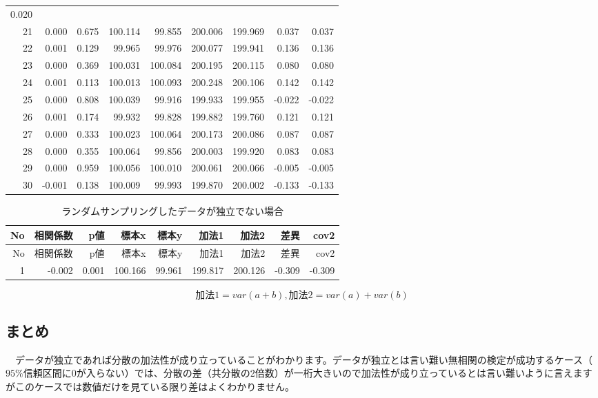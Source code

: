 \documentclass[]{tufte-handout}
\begin{document}
\begin{longtable}[]{@{}rrrrrrrrr@{}}
0.020 \\
21 & 0.000 & 0.675 & 100.114 & 99.855 & 200.006 & 199.969 & 0.037 &
0.037 \\
22 & 0.001 & 0.129 & 99.965 & 99.976 & 200.077 & 199.941 & 0.136 &
0.136 \\
23 & 0.000 & 0.369 & 100.031 & 100.084 & 200.195 & 200.115 & 0.080 &
0.080 \\
24 & 0.001 & 0.113 & 100.013 & 100.093 & 200.248 & 200.106 & 0.142 &
0.142 \\
25 & 0.000 & 0.808 & 100.039 & 99.916 & 199.933 & 199.955 & -0.022 &
-0.022 \\
26 & 0.001 & 0.174 & 99.932 & 99.828 & 199.882 & 199.760 & 0.121 &
0.121 \\
27 & 0.000 & 0.333 & 100.023 & 100.064 & 200.173 & 200.086 & 0.087 &
0.087 \\
28 & 0.000 & 0.355 & 100.064 & 99.856 & 200.003 & 199.920 & 0.083 &
0.083 \\
29 & 0.000 & 0.959 & 100.056 & 100.010 & 200.061 & 200.066 & -0.005 &
-0.005 \\
30 & -0.001 & 0.138 & 100.009 & 99.993 & 199.870 & 200.002 & -0.133 &
-0.133 \\
\bottomrule
\end{longtable}

\begin{longtable}[]{@{}rrrrrrrrr@{}}
\caption{ランダムサンプリングしたデータが独立でない場合}\tabularnewline
\toprule
No & 相関係数 & p値 & 標本x & 標本y & 加法1 & 加法2 & 差異 & cov2 \\
\midrule
\endfirsthead
\toprule
No & 相関係数 & p値 & 標本x & 標本y & 加法1 & 加法2 & 差異 & cov2 \\
\midrule
\endhead
1 & -0.002 & 0.001 & 100.166 & 99.961 & 199.817 & 200.126 & -0.309 &
-0.309 \\
\bottomrule
\end{longtable}

\[\mbox{加法1} = var(a + b),　\mbox{加法2} = var(a) + var(b)\]

\newpage

\hypertarget{ux307eux3068ux3081}{%
\subsection{まとめ}\label{ux307eux3068ux3081}}

　データが独立であれば分散の加法性が成り立っていることがわかります。データが独立とは言い難い無相関の検定が成功するケース（\(95\%\)信頼区間に\(0\)が入らない）では、分散の差（共分散の2倍数）が一桁大きいので加法性が成り立っているとは言い難いように言えますがこのケースでは数値だけを見ている限り差はよくわかりません。
\end{document}
